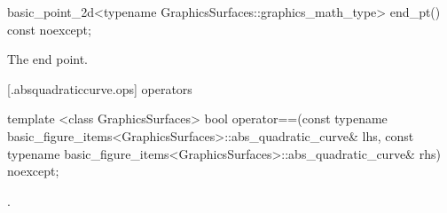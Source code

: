 %
\begin{itemdecl}
basic_point_2d<typename GraphicsSurfaces::graphics_math_type> end_pt() const noexcept;
\end{itemdecl}
\begin{itemdescr}
\pnum
\returns
The end point.
\end{itemdescr}

 [\iotwod.absquadraticcurve.ops]{ operators}

%
\begin{itemdecl}
template <class GraphicsSurfaces>
bool operator==(const typename basic_figure_items<GraphicsSurfaces>::abs_quadratic_curve& lhs,
  const typename basic_figure_items<GraphicsSurfaces>::abs_quadratic_curve& rhs) noexcept;
\end{itemdecl}
\begin{itemdescr}
\pnum
\returns
{}.
\end{itemdescr}
